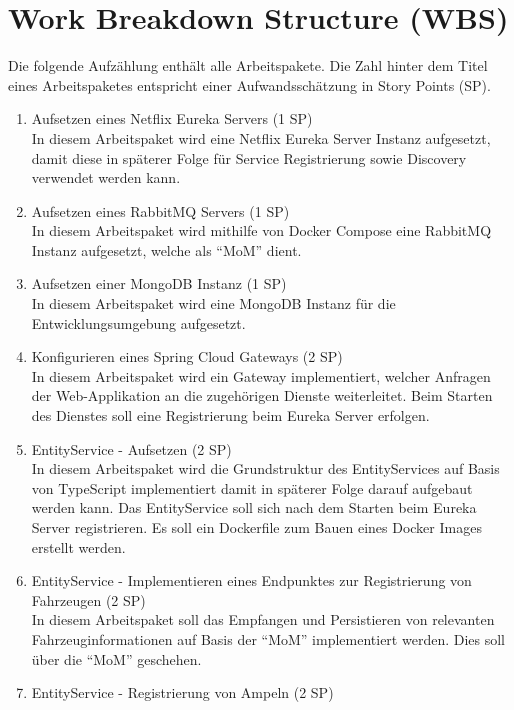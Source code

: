 \section{Work Breakdown Structure (WBS)}

Die folgende Aufzählung enthält alle Arbeitspakete.
Die Zahl hinter dem Titel eines Arbeitspaketes entspricht einer Aufwandsschätzung in Story Points (SP).

\begin{enumerate}
  \item Aufsetzen eines Netflix Eureka Servers (1 SP)\\
  		In diesem Arbeitspaket wird eine Netflix Eureka Server Instanz aufgesetzt, damit diese in späterer Folge für Service Registrierung sowie Discovery verwendet werden kann.
  \item Aufsetzen eines RabbitMQ Servers (1 SP)\\
  		In diesem Arbeitspaket wird mithilfe von Docker Compose eine RabbitMQ Instanz aufgesetzt, welche als \enquote{MoM} dient.
  \item Aufsetzen einer MongoDB Instanz (1 SP)\\
  		In diesem Arbeitspaket wird eine MongoDB Instanz für die Entwicklungsumgebung aufgesetzt.
  \item Konfigurieren eines Spring Cloud Gateways (2 SP)\\
  		In diesem Arbeitspaket wird ein Gateway implementiert, welcher Anfragen der Web-Applikation an die zugehörigen Dienste weiterleitet.
  		Beim Starten des Dienstes soll eine Registrierung beim Eureka Server erfolgen.
  \item EntityService - Aufsetzen (2 SP)\\
  		In diesem Arbeitspaket wird die Grundstruktur des EntityServices auf Basis von TypeScript implementiert damit in späterer Folge darauf aufgebaut werden kann.
  		Das EntityService soll sich nach dem Starten beim Eureka Server registrieren.
  		Es soll ein Dockerfile zum Bauen eines Docker Images erstellt werden.
  \item EntityService - Implementieren eines Endpunktes zur Registrierung von Fahrzeugen (2 SP)\\
  		In diesem Arbeitspaket soll das Empfangen und Persistieren von relevanten Fahrzeuginformationen auf Basis der \enquote{MoM} implementiert werden.
  		Dies soll über die \enquote{MoM} geschehen.
  \item EntityService - Registrierung von Ampeln (2 SP)\\

\end{enumerate}
